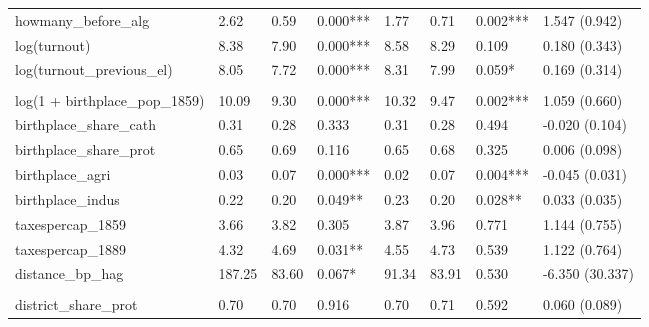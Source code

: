 \begin{table}[!h]
{\begin{threeparttable}
\begin{tabular}[t]{llllllll}
\hspace{1em}howmany\_before\_alg & \num{2.62} & \num{0.59} & 0.000*** & \num{1.77} & \num{0.71} & 0.002*** & 1.547 (0.942)\\
\hspace{1em}log(turnout) & \num{8.38} & \num{7.90} & 0.000*** & \num{8.58} & \num{8.29} & 0.109 & 0.180 (0.343)\\
\hspace{1em}log(turnout\_previous\_el) & \num{8.05} & \num{7.72} & 0.000*** & \num{8.31} & \num{7.99} & 0.059* & 0.169 (0.314)\\
\addlinespace[0.3em]
\multicolumn{8}{l}{\textbf{Panel D: Birthplace Characteristics}}\\
\hspace{1em}log(1 + birthplace\_pop\_1859) & \num{10.09} & \num{9.30} & 0.000*** & \num{10.32} & \num{9.47} & 0.002*** & 1.059 (0.660)\\
\hspace{1em}birthplace\_share\_cath & \num{0.31} & \num{0.28} & 0.333 & \num{0.31} & \num{0.28} & 0.494 & -0.020 (0.104)\\
\hspace{1em}birthplace\_share\_prot & \num{0.65} & \num{0.69} & 0.116 & \num{0.65} & \num{0.68} & 0.325 & 0.006 (0.098)\\
\hspace{1em}birthplace\_agri & \num{0.03} & \num{0.07} & 0.000*** & \num{0.02} & \num{0.07} & 0.004*** & -0.045 (0.031)\\
\hspace{1em}birthplace\_indus & \num{0.22} & \num{0.20} & 0.049** & \num{0.23} & \num{0.20} & 0.028** & 0.033 (0.035)\\
\hspace{1em}taxespercap\_1859 & \num{3.66} & \num{3.82} & 0.305 & \num{3.87} & \num{3.96} & 0.771 & 1.144 (0.755)\\
\hspace{1em}taxespercap\_1889 & \num{4.32} & \num{4.69} & 0.031** & \num{4.55} & \num{4.73} & 0.539 & 1.122 (0.764)\\
\hspace{1em}distance\_bp\_hag & \num{187.25} & \num{83.60} & 0.067* & \num{91.34} & \num{83.91} & 0.530 & -6.350 (30.337)\\
\addlinespace[0.3em]
\multicolumn{8}{l}{\textbf{Panel E: District Characteristics}}\\
\hspace{1em}district\_share\_prot & \num{0.70} & \num{0.70} & 0.916 & \num{0.70} & \num{0.71} & 0.592 & 0.060 (0.089)\\

\end{tabular}
\end{threeparttable}}
\end{table}
